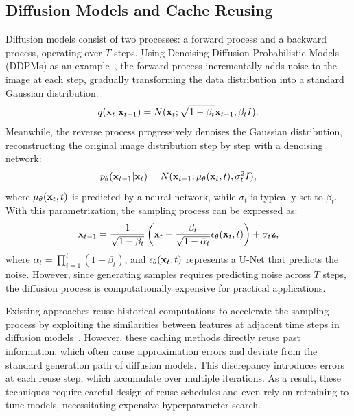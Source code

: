 \subsection{Diffusion Models and Cache Reusing}
Diffusion models consist of two processes: a forward process and a backward process, operating over $T$ steps. Using Denoising Diffusion Probabilistic Models (DDPMs) as an example~\citep{ho2020denoising}, the forward process incrementally adds noise to the image at each step, gradually transforming the data distribution into a standard Gaussian distribution:
\begin{equation}
    q({\mathbf{x}}_t|{\mathbf{x}}_{t-1})=N({\mathbf{x}}_t;\sqrt{1-\beta_t}{\mathbf{x}}_{t-1},\beta_tI).
\end{equation}
Meanwhile, the reverse process progressively denoises the Gaussian distribution, reconstructing the original image distribution step by step with a denoising network:
\begin{equation}
    p_\theta({\mathbf{x}}_{t-1}|{\mathbf{x}}_t)=N({\mathbf{x}}_{t-1};\mu_\theta({\mathbf{x}}_t,t),\sigma_t^2I),
\end{equation}
where \(\mu_\theta({\mathbf{x}}_t, t)\) is predicted by a neural network, while \(\sigma_t\) is typically set to \(\beta_t\). With this parametrization, the sampling process can be expressed as:
\begin{equation}
\label{eqn:diffusion}
    {\mathbf{x}}_{t-1}=\frac{1}{\sqrt{1-\beta_t}}\left({\mathbf{x}}_t-\frac{\beta_t}{\sqrt{1-\bar{\alpha}_t}}\epsilon_\theta({\mathbf{x}}_t,t)\right)+\sigma_t{\mathbf{z}},
\end{equation}
where \(\bar{\alpha}_t = \prod_{i=1}^t (1 - \beta_t)\), and \(\epsilon_\theta({\mathbf{x}}_t, t)\) represents a U-Net that predicts the noise. However, since generating samples requires predicting noise across \(T\) steps, the diffusion process is computationally expensive for practical applications. 

Existing approaches reuse historical computations to accelerate the sampling process by exploiting the similarities between features at adjacent time steps in diffusion models~\citep{ma2024deepcache, wimbauer2024cache, ma2024learning}. However, these caching methods directly reuse past information, which often cause approximation errors and deviate from the standard generation path of diffusion models. This discrepancy introduces errors at each reuse step, which accumulate over multiple iterations. As a result, these techniques require careful design of reuse schedules and even rely on retraining to tune models, necessitating expensive hyperparameter search.

